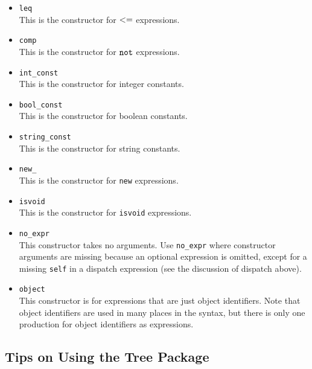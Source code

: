\begin{itemize}
\item {\tt leq}\\
This is the constructor for $\tt <=$ expressions.

\item {\tt comp}\\
This is the constructor for $\tt not$ expressions.

\item {\tt int\_const}\\
This is the constructor for integer constants.


\item {\tt bool\_const}\\
This is the constructor for boolean constants.

\item {\tt string\_const}\\
This is the constructor for string constants.

\item {\tt new\_}\\
This is the constructor for {\tt new} expressions.

\item {\tt isvoid}\\
This is the constructor for {\tt isvoid} expressions.

\item {\tt no\_expr}\\
This constructor takes no arguments.  Use {\tt no\_expr}
where constructor arguments are missing because an optional expression
is omitted, except for a missing {\tt self} in a dispatch expression
(see the discussion of dispatch above).

\item {\tt object} \\
This constructor is for expressions that are just object identifiers.
Note that object identifiers are used in many places in the syntax,
but there is only one production for object identifiers as expressions.

\end{itemize}

\subsection{Tips on Using the Tree Package}

